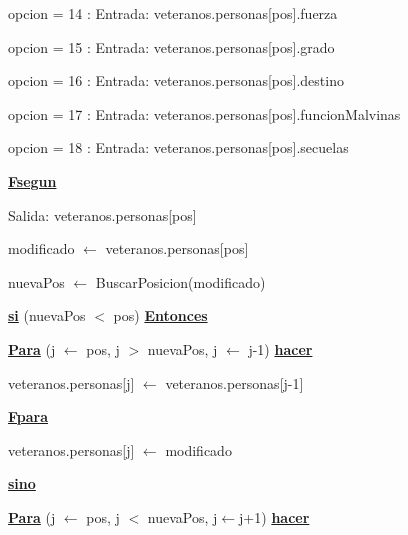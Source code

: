 \documentclass{article}
\begin{document}
                    \hspace{20mm}opcion = 14 : Entrada: veteranos.personas[pos].fuerza

                    \hspace{20mm}opcion = 15 : Entrada: veteranos.personas[pos].grado

                    \hspace{20mm}opcion = 16 : Entrada: veteranos.personas[pos].destino

                    \hspace{20mm}opcion = 17 : Entrada: veteranos.personas[pos].funcionMalvinas

                    \hspace{20mm}opcion = 18 : Entrada: veteranos.personas[pos].secuelas

                \hspace{16mm}\underline{\textbf{Fsegun}}
                
                \hspace{16mm}Salida: veteranos.personas[pos]

                \hspace{16mm}modificado $\leftarrow$ veteranos.personas[pos]

                \hspace{16mm}nuevaPos $\leftarrow$ BuscarPosicion(modificado)

                \hspace{16mm}\underline{\textbf{si}} (nuevaPos $<$ pos) \underline{\textbf{Entonces}}

                    \hspace{20mm}\underline{\textbf{Para}} (j $\leftarrow$ pos, j $>$ nuevaPos, j $\leftarrow$ j-1) \underline{\textbf{hacer}}

                        \hspace{24mm}veteranos.personas[j] $\leftarrow$ veteranos.personas[j-1]
                    
                    \hspace{20mm}\underline{\textbf{Fpara}}

                    \hspace{20mm}veteranos.personas[j] $\leftarrow$ modificado

                \hspace{16mm}\underline{\textbf{sino}}

                    \hspace{20mm}\underline{\textbf{Para}} (j $\leftarrow$ pos, j $<$ nuevaPos, j$\leftarrow$j+1) \underline{\textbf{hacer}}
\end{document}
